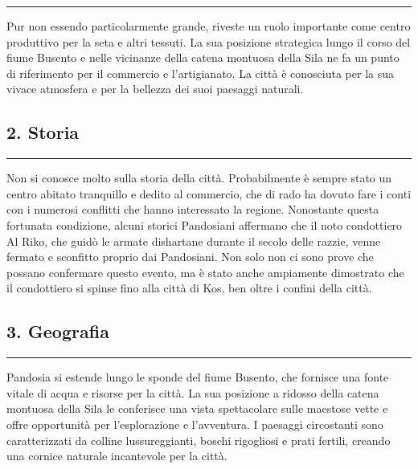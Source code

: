 \begin{center}\rule{0.5\linewidth}{0.5pt}\end{center}

Pur non essendo particolarmente grande, riveste un ruolo importante come
centro produttivo per la seta e altri tessuti. La sua posizione
strategica lungo il corso del fiume Busento e nelle vicinanze della
catena montuosa della Sila ne fa un punto di riferimento per il
commercio e l'artigianato. La città è conosciuta per la sua vivace
atmosfera e per la bellezza dei suoi paesaggi naturali.

\subsection{2. Storia}\label{storia}

\begin{center}\rule{0.5\linewidth}{0.5pt}\end{center}

Non si conosce molto sulla storia della città. Probabilmente è sempre
stato un centro abitato tranquillo e dedito al commercio, che di rado ha
dovuto fare i conti con i numerosi conflitti che hanno interessato la
regione. Nonostante questa fortunata condizione, alcuni storici
Pandosiani affermano che il noto condottiero Al Riko, che guidò le
armate dishartane durante il secolo delle razzie, venne fermato e
sconfitto proprio dai Pandosiani. Non solo non ci sono prove che possano
confermare questo evento, ma è stato anche ampiamente dimostrato che il
condottiero si spinse fino alla città di Kos, ben oltre i confini della
città.

\subsection{3. Geografia}\label{geografia}

\begin{center}\rule{0.5\linewidth}{0.5pt}\end{center}

Pandosia si estende lungo le sponde del fiume Busento, che fornisce una
fonte vitale di acqua e risorse per la città. La sua posizione a ridosso
della catena montuosa della Sila le conferisce una vista spettacolare
sulle maestose vette e offre opportunità per l'esplorazione e
l'avventura. I paesaggi circostanti sono caratterizzati da colline
lussureggianti, boschi rigogliosi e prati fertili, creando una cornice
naturale incantevole per la città.

